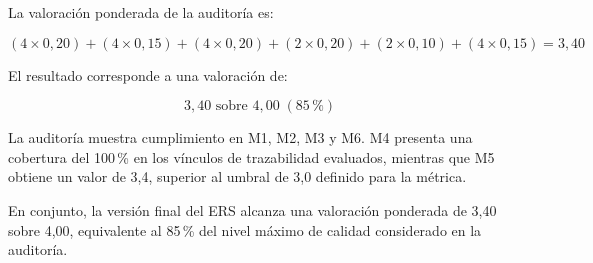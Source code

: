 La valoración ponderada de la auditoría es:

\begin{equation}
(4\times0{,}20)+(4\times0{,}15)+(4\times0{,}20)
+(2\times0{,}20)+(2\times0{,}10)+(4\times0{,}15)
=3{,}40
\end{equation}

El resultado corresponde a una valoración de:

\[
\boxed{3{,}40\text{ sobre }4{,}00\;(85\,\%)}
\]

La auditoría muestra cumplimiento en M1, M2, M3 y M6. M4 presenta una
cobertura del 100\,\% en los vínculos de trazabilidad evaluados, mientras que
M5 obtiene un valor de 3,4, superior al umbral de 3,0 definido para la
métrica.

En conjunto, la versión final del ERS alcanza una valoración ponderada de
3,40 sobre 4,00, equivalente al 85\,\% del nivel máximo de calidad considerado
en la auditoría.
